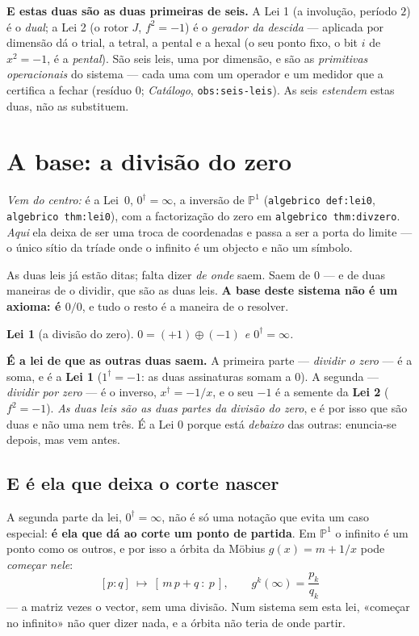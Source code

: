 \documentclass[11pt,a4paper]{article}
\newcommand{\code}[1]{\texttt{\small #1}}
\newtheorem{lei}{Lei}
\newcommand{\dg}{^{\dagger}}
\begin{document}
\noindent \textbf{E estas duas são as duas primeiras de seis.} A Lei 1 (a involução, período $2$) é o
\emph{dual}; a Lei 2 (o rotor $J$, $f^2=-1$) é o \emph{gerador da descida} --- aplicada por dimensão dá
o trial, a tetral, a pental e a hexal (o seu ponto fixo, o bit $i$ de $x^2=-1$, é a \emph{pental}). São
seis leis, uma por dimensão, e são as \emph{primitivas operacionais} do sistema --- cada uma com um
operador e um medidor que a certifica a fechar (resíduo $0$; \emph{Catálogo}, \code{obs:seis-leis}). As
seis \emph{estendem} estas duas, não as substituem.

\section{A base: a divisão do zero}\label{sec:zero}

\noindent\emph{Vem do centro:} é a Lei~0, $0\dg=\infty$, a inversão de $\mathbb{P}^1$
(\code{algebrico def:lei0}, \code{algebrico thm:lei0}), com a factorização do zero em
\code{algebrico thm:divzero}. \emph{Aqui} ela deixa de ser uma troca de coordenadas e passa
a ser a porta do limite --- o único sítio da tríade onde o infinito é um objecto e não um
símbolo.

As duas leis já estão ditas; falta dizer \emph{de onde} saem. Saem de $0$ --- e de duas maneiras de o
dividir, que são as duas leis. \textbf{A base deste sistema não é um axioma: é $0/0$}, e tudo o resto é
a maneira de o resolver.

\setcounter{lei}{-1}
\begin{lei}[a divisão do zero]\label{lei:zero}
$0=(+1)\oplus(-1)$ \quad e \quad $0\dg=\infty$.
\end{lei}
\setcounter{lei}{2}

\noindent \textbf{É a lei de que as outras duas saem.} A primeira parte --- \emph{dividir o zero} --- é a
soma, e é a \textbf{Lei 1} ($1\dg=-1$: as duas assinaturas somam a $0$). A segunda --- \emph{dividir por
zero} --- é o inverso, $x\dg=-1/x$, e o seu $-1$ é a semente da \textbf{Lei 2} ($f^2=-1$). \emph{As duas
leis são as duas partes da divisão do zero}, e é por isso que são duas e não uma nem três. É a Lei $0$
porque está \emph{debaixo} das outras: enuncia-se depois, mas vem antes.

\subsection*{E é ela que deixa o corte nascer}

\noindent A segunda parte da lei, $0\dg=\infty$, não é só uma notação que evita um caso
especial: \textbf{é ela que dá ao corte um ponto de partida}. Em $\mathbb{P}^1$ o infinito
é um ponto como os outros, e por isso a órbita da Möbius $g(x)=m+1/x$ pode \emph{começar
nele}:
\[
[p:q]\ \longmapsto\ [\,m\,p+q\ :\ p\,],
\qquad
g^{k}(\infty)=\frac{p_k}{q_k}
\]
--- a matriz vezes o vector, sem uma divisão. Num sistema sem esta lei, «começar no
infinito» não quer dizer nada, e a órbita não teria de onde partir.
\end{document}
